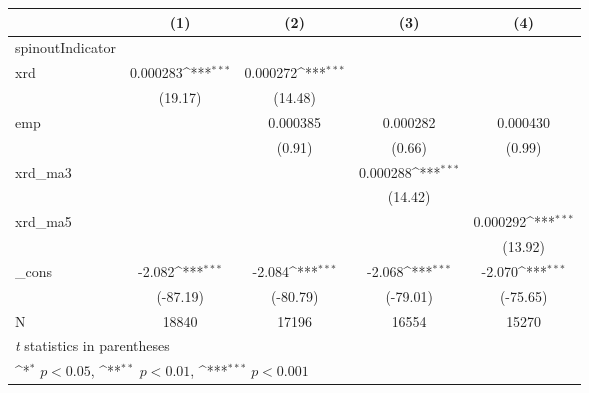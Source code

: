 {
\def\sym#1{\ifmmode^{#1}\else\(^{#1}\)\fi}
\begin{tabular}{l*{4}{c}}
\hline\hline
            &\multicolumn{1}{c}{(1)}         &\multicolumn{1}{c}{(2)}         &\multicolumn{1}{c}{(3)}         &\multicolumn{1}{c}{(4)}         \\
\hline
spinoutIndicator&                     &                     &                     &                     \\
xrd         &    0.000283\sym{***}&    0.000272\sym{***}&                     &                     \\
            &     (19.17)         &     (14.48)         &                     &                     \\
[1em]
emp         &                     &    0.000385         &    0.000282         &    0.000430         \\
            &                     &      (0.91)         &      (0.66)         &      (0.99)         \\
[1em]
xrd\_ma3     &                     &                     &    0.000288\sym{***}&                     \\
            &                     &                     &     (14.42)         &                     \\
[1em]
xrd\_ma5     &                     &                     &                     &    0.000292\sym{***}\\
            &                     &                     &                     &     (13.92)         \\
[1em]
\_cons      &      -2.082\sym{***}&      -2.084\sym{***}&      -2.068\sym{***}&      -2.070\sym{***}\\
            &    (-87.19)         &    (-80.79)         &    (-79.01)         &    (-75.65)         \\
\hline
N           &       18840         &       17196         &       16554         &       15270         \\
\hline\hline
\multicolumn{5}{l}{\footnotesize \textit{t} statistics in parentheses}\\
\multicolumn{5}{l}{\footnotesize \sym{*} \(p<0.05\), \sym{**} \(p<0.01\), \sym{***} \(p<0.001\)}\\
\end{tabular}
}
